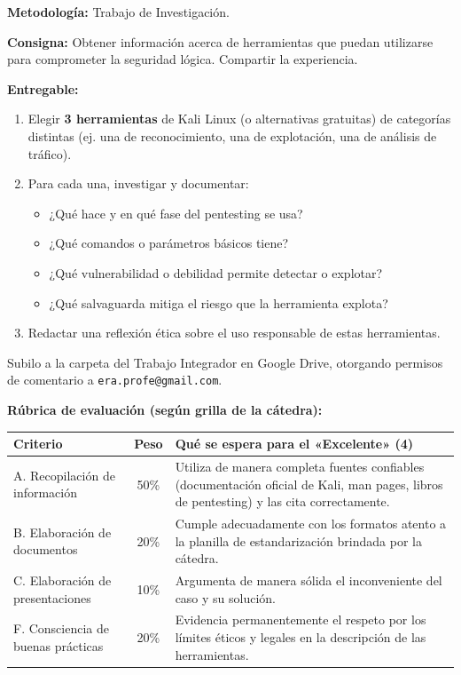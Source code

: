 \documentclass[11pt,a4paper]{article}
\begin{document}
\begin{clave}
\textbf{Metodología:} Trabajo de Investigación.

\textbf{Consigna:} Obtener información acerca de herramientas que puedan utilizarse para comprometer la seguridad lógica. Compartir la experiencia.

\textbf{Entregable:}
\begin{enumerate}
  \item Elegir \textbf{3 herramientas} de Kali Linux (o alternativas gratuitas) de categorías distintas (ej. una de reconocimiento, una de explotación, una de análisis de tráfico).
  \item Para cada una, investigar y documentar:
  \begin{itemize}
    \item ¿Qué hace y en qué fase del pentesting se usa?
    \item ¿Qué comandos o parámetros básicos tiene?
    \item ¿Qué vulnerabilidad o debilidad permite detectar o explotar?
    \item ¿Qué salvaguarda mitiga el riesgo que la herramienta explota?
  \end{itemize}
  \item Redactar una reflexión ética sobre el uso responsable de estas herramientas.
\end{enumerate}

Subilo a la carpeta del Trabajo Integrador en Google Drive, otorgando permisos de comentario a \texttt{era.profe@gmail.com}.
\end{clave}

\textbf{Rúbrica de evaluación (según grilla de la cátedra):}
\begin{center}
\renewcommand{\arraystretch}{1.2}
\begin{tabularx}{\textwidth}{@{} l c X @{} }
\toprule
\textbf{Criterio} & \textbf{Peso} & \textbf{Qué se espera para el «Excelente» (4)} \\
\midrule
A. Recopilación de información & 50\% & Utiliza de manera completa fuentes confiables (documentación oficial de Kali, man pages, libros de pentesting) y las cita correctamente. \\
B. Elaboración de documentos & 20\% & Cumple adecuadamente con los formatos atento a la planilla de estandarización brindada por la cátedra. \\
C. Elaboración de presentaciones & 10\% & Argumenta de manera sólida el inconveniente del caso y su solución. \\
F. Consciencia de buenas prácticas & 20\% & Evidencia permanentemente el respeto por los límites éticos y legales en la descripción de las herramientas. \\
\bottomrule
\end{tabularx}
\end{center}
\end{document}

